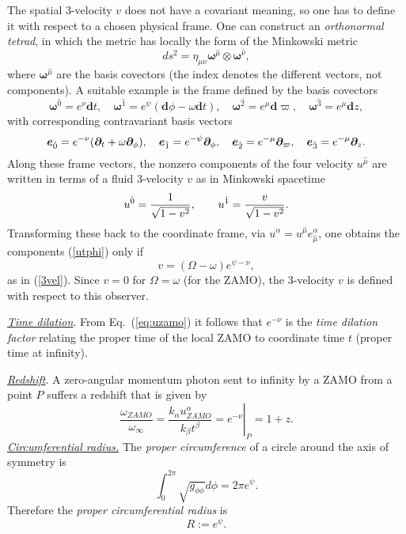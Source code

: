 \documentclass[12pt]{article}
\def\be{\begin{equation}}
\def\ee{\end{equation}}
\begin{document}
 The spatial 3-velocity $v$ does not have a covariant meaning, so one has to define it with respect to a chosen physical frame. One can construct an
\textit{orthonormal tetrad}, in which the metric has locally the form of the 
Minkowski metric
\begin{equation}
ds^2=\eta_{\mu\nu} {\bm \omega}^{\hat \mu} \otimes {\bm \omega}^{\hat \nu},
\end{equation}
where ${\bm \omega}^{\hat \mu}$ are the basis covectors (the index
denotes the different vectors, not components). A suitable example 
is the frame defined by the basis covectors
\be
{\bm \omega}^{\hat 0} = e^{\nu} {\bm d}t ,\quad 
{\bm \omega}^{\hat 1} = e^{\psi}({\bm d}\phi -\omega {\bm d}t),\quad 
{\bm \omega}^{\hat2} = e^{\mu}{\bm d}\varpi ,\quad 
{\bm \omega}^{\hat3} = e^{\mu} {\bm d}z,
\label{eq:omi}
\ee
with corresponding contravariant basis vectors
\be
{\bm e}_{\hat 0} = e^{-\nu} ({\bm \partial}_t 
                   + \omega {\bm \partial}_{\phi}),
\quad {\bm e}_{\hat 1} = e^{-\psi} {\bm \partial}_{\phi},
\quad {\bm e}_{\hat2} = e^{-\mu} {\bm \partial}_{\varpi} ,
\quad {\bm e}_{\hat3}= e^{-\mu} {\bm \partial}_z. \label{ei}
\index{rotating stars!basis vectors}\ee
Along these 
frame vectors, the nonzero components of the four velocity $u^{\hat \mu}$ are written in terms of a fluid 3-velocity 
$v$ as in Minkowski spacetime
\be
u^{\hat 0} = {1\over{{\sqrt{1-v^2}}}} , \qquad  u^{\hat 1}
= {v\over{{\sqrt{1-v^2}}}}.
\label{eq:utetrad}\ee
Transforming these back to the coordinate frame, via $u^\alpha=
u^{\hat \mu}e^\alpha_{\hat\mu}$, one obtains the components 
(\ref{utphi}) only if 
\be
\boxed{v =(\Omega - \omega) e^{\psi -\nu} },
\label{eq:v}
\ee
as in (\ref{3vel}). Since $v=0$ for $\Omega=\omega$ 
(for the ZAMO), the 3-velocity $v$ is defined with respect to this observer.

\vskip0.8cm

\noindent \textit{\uline{Time dilation}}. From 
Eq.~(\ref{eq:uzamo}) it  follows that $e^{-\nu}$ is the {\it time dilation factor} 
relating the proper time of the local 
ZAMO to coordinate time $t$ (proper time at infinity). 

\vskip0.8cm
\noindent \textit{\uline{Redshift}}. A zero-angular momentum photon 
sent to infinity by a ZAMO from a point $P $ suffers a redshift that  is given by 
\be \left.  \frac{\omega_{ZAMO}}{\omega_\infty}
        = \frac{k_\alpha u_{ZAMO}^\alpha }{ k_\beta t^\beta} = e^{-\nu}\right|_P = 1+z.
        \ee
\vskip0.8cm
\noindent \textit{\uline{Circumferential radius.}}
The {\it proper circumference} of a circle around the axis of
symmetry is
\be \int_0^{2\pi} \sqrt{g_{\phi\phi}}d\phi=2\pi e^\psi.
\ee 
Therefore the  \textit{proper 
circumferential  radius} is
\be \boxed{R:=e^\psi }.
\ee 
\end{document}
